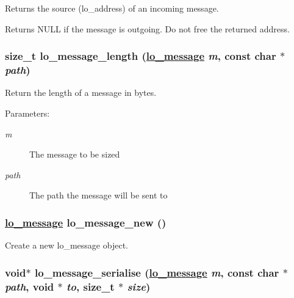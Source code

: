 Returns the source (lo\_\-address) of an incoming message. 

Returns NULL if the message is outgoing. Do not free the returned address. \hypertarget{group__liblolowlevel_g0855039d071b7031727213272857c27e}{
\subsubsection[lo\_\-message\_\-length]{\setlength{\rightskip}{0pt plus 5cm}size\_\-t lo\_\-message\_\-length (\hyperlink{lo__types_8h_d126083c98d941f00eb72d1690b38d63}{lo\_\-message} {\em m}, const char $\ast$ {\em path})}}
\label{group__liblolowlevel_g0855039d071b7031727213272857c27e}


Return the length of a message in bytes. 

\begin{Desc}
\item[Parameters:]
\begin{description}
\item[{\em m}]The message to be sized \item[{\em path}]The path the message will be sent to \end{description}
\end{Desc}
\hypertarget{group__liblolowlevel_g2cce2e97452e3e9d6b5d3af33bb1d153}{
\subsubsection[lo\_\-message\_\-new]{\setlength{\rightskip}{0pt plus 5cm}\hyperlink{lo__types_8h_d126083c98d941f00eb72d1690b38d63}{lo\_\-message} lo\_\-message\_\-new ()}}
\label{group__liblolowlevel_g2cce2e97452e3e9d6b5d3af33bb1d153}


Create a new lo\_\-message object. 

\hypertarget{group__liblolowlevel_g5a14045edea33d63792e9a4c82e13b02}{
\subsubsection[lo\_\-message\_\-serialise]{\setlength{\rightskip}{0pt plus 5cm}void$\ast$ lo\_\-message\_\-serialise (\hyperlink{lo__types_8h_d126083c98d941f00eb72d1690b38d63}{lo\_\-message} {\em m}, const char $\ast$ {\em path}, void $\ast$ {\em to}, size\_\-t $\ast$ {\em size})}}
\label{group__liblolowlevel_g5a14045edea33d63792e9a4c82e13b02}


